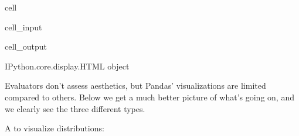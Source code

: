 \documentclass[letterpaper,10pt,english]{jupyterBook}
\begin{document}
\begin{sphinxuseclass}{cell}\begin{sphinxVerbatimInput}

\begin{sphinxuseclass}{cell_input}
\begin{sphinxVerbatim}[commandchars=\\\{\}]
\PYG{p}{[}\PYG{p}{]}     
 \PYGZbs{}
                     \PYGZbs{}
                    
\end{sphinxVerbatim}

\end{sphinxuseclass}\end{sphinxVerbatimInput}
\begin{sphinxVerbatimOutput}

\begin{sphinxuseclass}{cell_output}
\begin{sphinxVerbatim}[commandchars=\\\{\}]
\PYGZlt{}IPython.core.display.HTML object\PYGZgt{}
\end{sphinxVerbatim}

\end{sphinxuseclass}\end{sphinxVerbatimOutput}

\end{sphinxuseclass}
\sphinxAtStartPar
Evaluators don’t assess aesthetics, but Pandas’ visualizations are limited compared to others. Below we get a much better picture of what’s going on, and we clearly see the three different types.

\sphinxAtStartPar
A  to visualize distributions:
\end{document}
